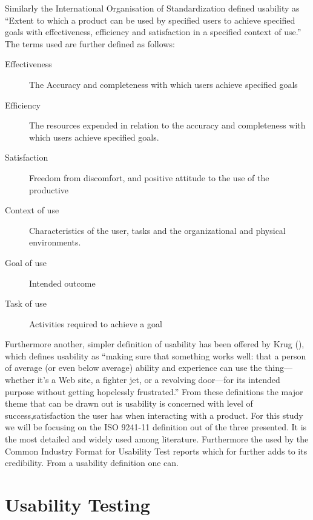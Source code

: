 \documentclass[a4paper,oneside,11pt]{report}
\begin{document}
Similarly the International Organisation of Standardization \autocite{ISO9241-11} defined usability as \enquote {Extent to which a product can be used by specified users to achieve specified goals with effectiveness, efficiency and satisfaction in a specified context of use.} 
The terms used are further defined as follows:

\begin{description}
  \item[Effectiveness] The Accuracy and completeness with which users achieve specified goals
  \item[Efficiency] The resources expended in relation to the accuracy and completeness with which users achieve specified goals.
  \item [Satisfaction] Freedom from discomfort, and positive attitude to the use of the productive
 \item [Context of use] Characteristics of the user, tasks and the organizational and physical environments.
  \item [Goal of use] Intended outcome
  \item [Task of use] Activities required to achieve a goal
\end{description}

Furthermore another, simpler definition of usability has been offered by Krug (\citeyear{krug2005}), which defines usability as \enquote {making sure that something works well: that a person of average (or even below average) ability and experience can use the 
thing—whether it’s a Web site, a fighter jet, or a revolving door—for its intended purpose without getting hopelessly frustrated.}
 From these definitions the major theme that can be drawn out is usability is concerned with level of success,satisfaction the user has when interacting with a product. For this study we will be focusing on the ISO 9241-11 definition out of the three presented. It is the most detailed and widely used among literature. Furthermore the used by the Common Industry Format for Usability Test reports which for further adds to its credibility. From a usability definition one can.
\printbibliography
\section{Usability Testing}
\end{document}
